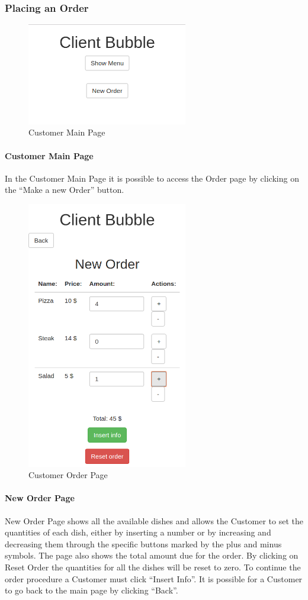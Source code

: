 \subsubsection{Placing an Order}
\begin{figure}[H]
	\centering
	\includegraphics[width=7cm]{../../documenti/UserManualDemo/demo_screens/client_main.png}
	\caption{Customer Main Page}
\end{figure}
\paragraph{Customer Main Page}
In the Customer Main Page it is possible to access the Order page by clicking on the ``Make a new Order'' button.
\begin{figure}[H]
	\centering
	\includegraphics[width=7cm]{../../documenti/UserManualDemo/demo_screens/client_dishes.png}
	\caption{Customer Order Page}
\end{figure}
\paragraph{New Order Page}
New Order Page shows all the available dishes and allows the Customer to set the quantities of each dish, either by inserting a number or by increasing and decreasing them through the specific buttons marked by the plus and minus symbols. The page also shows the total amount due for the order.
By clicking on Reset Order the quantities for all the dishes will be reset to zero.
To continue the order procedure a Customer must click ``Insert Info''. 
It is possible for a Customer to go back to the main page by clicking ``Back''.

